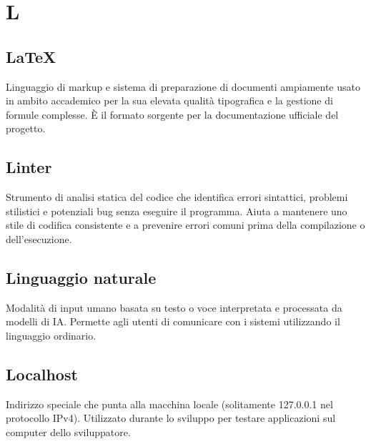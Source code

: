 \documentclass[a4paper, 11pt, oneside]{scrartcl} %
\begin{document}

\section*{L}


\subsection*{LaTeX}


Linguaggio di markup e sistema di preparazione di documenti ampiamente usato in ambito accademico per la sua elevata qualità tipografica e la gestione di formule complesse. È il formato sorgente per la documentazione ufficiale del progetto.

\vspace{0.5cm}

\subsection*{Linter}
Strumento di analisi statica del codice che identifica errori sintattici, problemi stilistici e potenziali bug senza eseguire il programma. Aiuta a mantenere uno stile di codifica consistente e a prevenire errori comuni prima della compilazione o dell'esecuzione.
\vspace{0.5cm}

\subsection*{Linguaggio naturale}


Modalità di input umano basata su testo o voce interpretata e processata da modelli di IA. Permette agli utenti di comunicare con i sistemi utilizzando il linguaggio ordinario.

\vspace{0.5cm}

\subsection*{Localhost}


Indirizzo speciale che punta alla macchina locale (solitamente 127.0.0.1 nel protocollo IPv4). Utilizzato durante lo sviluppo per testare applicazioni sul computer dello sviluppatore.
\end{document}
